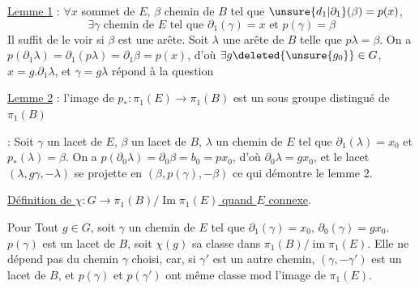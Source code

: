 
\uline{Lemme 1} : $\forall x$ sommet de $E$, $\beta$ chemin de $B$ tel que $\unsure{d_1|\partial_1}(\beta)=p(x)$,
\[
\exists\gamma\text{ chemin de }E\text{ tel que }\partial_1(\gamma)=x\text{ et }p(\gamma)=\beta
\]
 Il suffit de le voir si $\beta$ est une arête. Soit $\lambda$ une arête de $B$ telle que $p\lambda=\beta$. On a \deleted{$\unsure{\partial}$} $p(\partial_1\lambda)=\partial_1(p\lambda)=\partial_1\beta=p(x)$, d'où $\exists g\deleted{\unsure{g_0}}\in G$, $x=g.\partial_1\lambda$, et $\gamma=g\lambda$ répond à la question

\uline{Lemme 2} : l'image de $p_*:\pi_1(E)\to\pi_1(B)$ est un sous groupe distingué de $\pi_1(B)$

 : Soit $\gamma$ un lacet de  $E$, $\beta$ un lacet de $B$, $\lambda$ un chemin de $E$ tel que $\partial_1(\lambda)=x_0$ et $p_*(\lambda)=\beta$. On a $p(\partial_0\lambda)=\partial_0\beta=b_0=px_0$, d'où $\partial_0\lambda=gx_0$, et le lacet $(\lambda,g\gamma,-\lambda)$ se projette en $(\beta,p(\gamma),-\beta)$ ce qui démontre le lemme 2.

\uline{Définition de $\chi:G\to\pi_1(B)/\operatorname{Im}\pi_1(E)$ quand $E$ connexe}.

Pour Tout $g\in G$, soit $\gamma$ un chemin de $E$ tel que $\partial_1(\gamma)=x_0$, $\partial_0(\gamma)=gx_0$.  $p(\gamma)$ est un lacet de $B$, soit $\chi(g)$ sa classe dans $\pi_1(B)/\operatorname{im}\pi_1(E)$. Elle ne dépend pas du chemin $\gamma$ choisi, car, si $\gamma'$ est un autre chemin, $(\gamma,-\gamma')$ est un lacet de $B$, et  $p(\gamma)$ et $p(\gamma')$ ont même classe mod l'image de $\pi_1(E)$.

